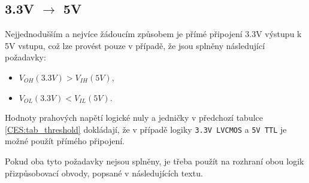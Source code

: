     \subsection{3.3V $\rightarrow$ 5V} %
      Nejjednodušším a nejvíce žádoucím způsobem je přímé připojení 3.3V výstupu k 5V vstupu, což
      lze provést pouze v případě, že jsou splněny následující požadavky:
        \begin{itemize}\addtolength{\itemsep}{-0.5\baselineskip}
          \item $V_{OH}(3.3V)>V_{IH}(5V)$,
          \item $V_{OL}(3.3V)<V_{IL}(5V)$.
        \end{itemize}
      Hodnoty prahových napětí logické nuly a jedničky v předchozí tabulce \ref{CES:tab_threshold}
      dokládají, že v případě logiky \texttt{3.3V LVCMOS} a \texttt{5V TTL} je možné použít přímého
      připojení. 


      Pokud oba tyto požadavky nejsou splněny, je třeba použít na rozhraní obou logik
      přizpůsobovací obvody, popsané v následujících textu. 

